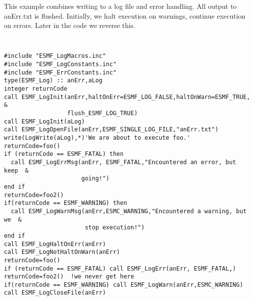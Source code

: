 This example combines writing
to a log file
and error handling.
All output to anErr.txt is flushed. 
Initially, we halt execution on
warnings, continue
execution on errors.  Later in the code we reverse this.

{\tt
\begin{verbatim}
#include "ESMF_LogMacros.inc"
#include "ESMF_LogConstants.inc"
#include "ESMF_ErrConstants.inc"
type(ESMF_Log) :: anErr,aLog
integer returnCode 
call ESMF_LogInit(anErr,haltOnErr=ESMF_LOG_FALSE,haltOnWarn=ESMF_TRUE, &
                  flush_ESMF_LOG_TRUE)
call ESMF_LogInit(aLog)
call ESMF_LogOpenFile(anErr,ESMF_SINGLE_LOG_FILE,"anErr.txt")
write(LogWrite(aLog),*)'We are about to execute foo.'
returnCode=foo()
if (returnCode == ESMF_FATAL) then
  call ESMF_LogErrMsg(anErr, ESMF_FATAL,"Encountered an error, but keep  &
                      going!")
end if
returnCode=foo2()
if(returnCode == ESMF_WARNING) then
  call ESMF_LogWarnMsg(anErr,ESMC_WARNING,"Encountered a warning, but we  &
                       stop execution!")
end if
call ESMF_LogHaltOnErr(anErr)
call ESMF_LogNotHaltOnWarn(anErr)
returnCode=foo()
if (returnCode == ESMF_FATAL) call ESMF_LogErr(anErr, ESMF_FATAL,)
returnCode=foo2()  !we never get here
if(returnCode == ESMF_WARNING) call ESMF_LogWarn(anErr,ESMC_WARNING)
call ESMF_LogCloseFile(anErr)
\end{verbatim}
}\tt

